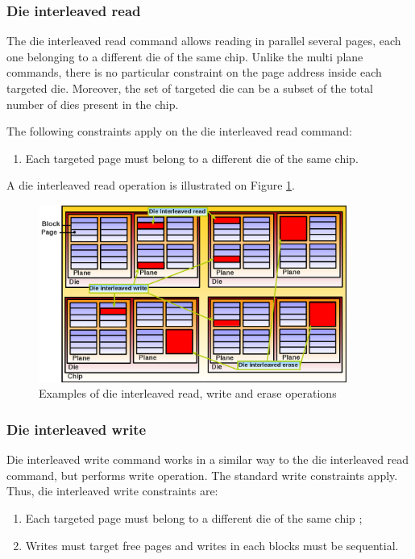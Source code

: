 \subsubsection{Die interleaved read}
The die interleaved read command allows reading in parallel several pages, each one belonging to a different die of the same chip. Unlike the multi plane commands, there is no particular constraint on the page address inside each targeted die. Moreover, the set of targeted die can be a subset of the total number of dies present in the chip.

The following constraints apply on the die interleaved read command:

\begin{enumerate}
  \item Each targeted page must belong to a different die of the same chip.
\end{enumerate}

A die interleaved read operation is illustrated on Figure \ref{fig:dieinterleavedop}.

\begin{figure}
  \center
  \includegraphics[width=0.9\textwidth]{Includes/DieInterleavedOp.png}
  \caption{Examples of die interleaved read, write and erase operations}
  \label{fig:dieinterleavedop}
\end{figure}

\subsubsection{Die interleaved write}
Die interleaved write command works in a similar way to the die interleaved read command, but performs write operation. The standard write constraints apply. Thus, die interleaved write constraints are:

\begin{enumerate}
  \item Each targeted page must belong to a different die of the same chip ;
  \item Writes must target free pages and writes in each blocks must be sequential.
\end{enumerate}


